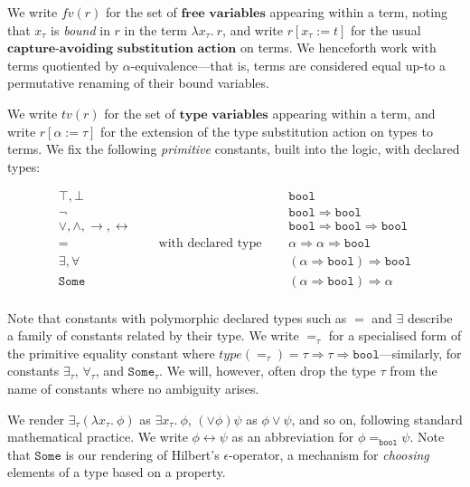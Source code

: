 \documentclass[a4paper, 10pt]{article}
\newcommand{\deffont}[1]{\ensuremath{\textbf{#1}}}
\newcommand{\lam}[1]{\lambda{#1}.\ }
\newcommand{\xsts}[1]{\exists{#1}.\ }
\begin{document}
We write $fv(r)$ for the set of \deffont{free variables} appearing within a term, noting that $x_\tau$ is \emph{bound} in $r$ in the term $\lam{x_\tau}r$, and write $r[x_\tau := t]$ for the usual \deffont{capture-avoiding substitution action} on terms.
We henceforth work with terms quotiented by $\alpha$-equivalence---that is, terms are considered equal up-to a permutative renaming of their bound variables.

We write $tv(r)$ for the set of \deffont{type variables} appearing within a term, and write $r[\alpha := \tau]$ for the extension of the type substitution action on types to terms.
We fix the following \emph{primitive} constants, built into the logic, with declared types:

\begin{displaymath}
\begin{array}{ccc}
\top, \bot & & \mathtt{bool} \\
\neg & & \mathtt{bool} \Rightarrow \mathtt{bool} \\
\vee, \wedge, \longrightarrow, \longleftrightarrow &  & \mathtt{bool} \Rightarrow \mathtt{bool} \Rightarrow \mathtt{bool} \\
= & \quad\text{ with declared type }\quad & \alpha \Rightarrow \alpha \Rightarrow \mathtt{bool} \\
\exists, \forall & & (\alpha \Rightarrow \mathtt{bool}) \Rightarrow \mathtt{bool} \\
\mathtt{Some} & & (\alpha \Rightarrow \mathtt{bool}) \Rightarrow \alpha \\
\end{array}
\end{displaymath}

Note that constants with polymorphic declared types such as $=$ and $\exists$ describe a family of constants related by their type.
We write $=_\tau$ for a specialised form of the primitive equality constant where $type(=_\tau) = \tau \Rightarrow \tau \Rightarrow \mathtt{bool}$---similarly, for constants $\exists_\tau$, $\forall_\tau$, and $\mathtt{Some}_\tau$.
We will, however, often drop the type $\tau$ from the name of constants where no ambiguity arises.

We render $\exists_\tau(\lam{x_\tau}\phi)$ as $\xsts{x_\tau}\phi$, $(\vee \phi)\psi$ as $\phi \vee \psi$, and so on, following standard mathematical practice.
We write $\phi \longleftrightarrow \psi$ as an abbreviation for $\phi =_\mathtt{bool} \psi$.
Note that $\mathtt{Some}$ is our rendering of Hilbert's $\epsilon$-operator, a mechanism for \emph{choosing} elements of a type based on a property.
\end{document}
